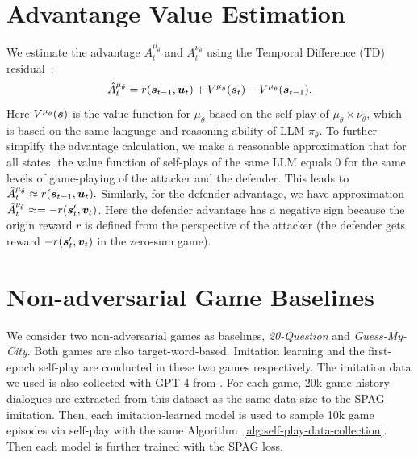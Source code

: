 \documentclass{article}
\theoremstyle{plain}
\theoremstyle{definition}
\theoremstyle{remark}
\begin{document}
\section{Advantange Value Estimation}\label{sec:appendix-advantage-estimation}
\vspace{-2mm}
We estimate the advantage $A_t^{\mu_{\bar{\theta}}}$ and $A_t^{\nu_{\bar{\theta}}}$ using the Temporal Difference (TD) residual~\citep{sutton1988learning}:
\begin{equation}
    \hat{A}^{\mu_{\bar{\theta}}}_t = r({\bm{s}}_{t-1}, {\bm{u}}_t) + V^{\mu_{\bar{\theta}}}({\bm{s}}_t) -  V^{\mu_{\bar{\theta}}}({\bm{s}}_{t-1}).
\end{equation}
Here $V^{\mu_{\bar{\theta}}}({\bm{s}})$ is the value function for $\mu_{\bar{\theta}}$ based on the self-play of $\mu_{\bar{\theta}} \times \nu_{\bar{\theta}}$, which is based on the same language and reasoning ability of LLM $\pi_{\bar{\theta}}$. To further simplify the advantage calculation, we make a reasonable approximation that for all states, the value function of self-plays of the same LLM equals $0$ for the same levels of game-playing of the attacker and the defender. This leads to $ \hat{A}^{\mu_{\bar{\theta}}}_t \approx r({\bm{s}}_{t-1}, {\bm{u}}_{t}).$ Similarly, for the defender advantage, we have approximation $\hat{A}^{\nu_{\bar{\theta}}}_t \approx = - r({\bm{s}}'_{t}, {\bm{v}}_t)$. Here the defender advantage has a negative sign because the origin reward $r$ is defined from the perspective of the attacker (the defender gets reward $-r({\bm{s}}'_t, {\bm{v}}_t)$ in the zero-sum game).

\vspace{-2mm}
\section{Non-adversarial Game Baselines}\label{sec:non-adversarial-game-baselines}
\vspace{-2mm}
We consider two non-adversarial games as baselines, \textit{20-Question} and \textit{Guess-My-City}. Both games are also target-word-based. Imitation learning and the first-epoch self-play are conducted in these two games respectively. The imitation data we used is also collected with GPT-4 from \citet{abdulhai2023lmrl}. For each game, 20k game history dialogues are extracted from this dataset as the same data size to the SPAG imitation. Then, each imitation-learned model is used to sample 10k game episodes via self-play with the same Algorithm~\ref{alg:self-play-data-collection}. Then each model is further trained with the SPAG loss.  %
\end{document}
